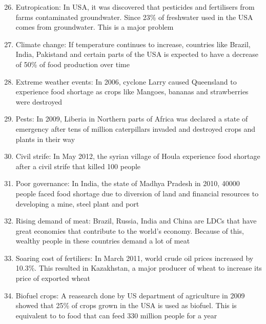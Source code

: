 \documentclass[oneside]{book}
\begin{document}
\newpage
\begin{enumerate}
  \setcounter{enumi}{25}
  \item Eutropication: In USA, it was discovered that pesticides and fertilisers from farms contaminated groundwater. Since 23\% of freshwater used in the USA comes from groundwater. This is a major problem
    
    \item Climate change: If temperature continues to increase, countries like Brazil, India, Pakistand and certain parts of the USA is expected to have a decrease of 50\% of food production over time
    
    \item Extreme weather events: In 2006, cyclone Larry caused Queensland to experience food shortage as crops like Mangoes, bananas and strawberries were destroyed
    
    \item Pests: In 2009, Liberia in Northern parts of Africa was declared a state of emergency after tens of million caterpillars invaded and destroyed crops and plants in their way
    
    \item Civil strife: In May 2012, the syrian village of Houla experience food shortage after a civil strife that killed 100 people
    
    \item Poor governance: In India, the state of Madhya Pradesh in 2010, 40000 people faced food shortage due to diversion of land and financial resources to developing a mine, steel plant and port
    
    \item Rising demand of meat: Brazil, Russia, India and China are LDCs that have great economies that contribute to the world’s economy. Because of this, wealthy people in these countries demand a lot of meat
    
    \item Soaring cost of fertiliers: In March 2011, world crude oil prices increased by 10.3\%. This resulted in Kazakhstan, a major producer of wheat to increase its price of exported wheat
    
    \item Biofuel crops: A reasearch done by US department of agriculture in 2009 showed that 25\% of crops grown in the USA is used as biofuel. This is equivalent to to food that can feed 330 million people for a year
\end{enumerate}
\end{document}
